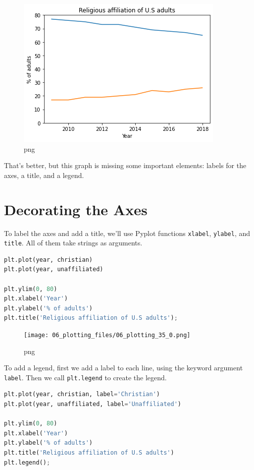 \documentclass[
]{book}
\newcommand{\passthrough}[1]{#1}
\begin{document}
\begin{figure}
\centering
\includegraphics{06_plotting_files/06_plotting_32_0.png}
\caption{png}
\end{figure}

That's better, but this graph is missing some important elements: labels
for the axes, a title, and a legend.

\section{Decorating the Axes}\label{decorating-the-axes}

To label the axes and add a title, we'll use Pyplot functions
\passthrough{\lstinline!xlabel!}, \passthrough{\lstinline!ylabel!}, and
\passthrough{\lstinline!title!}. All of them take strings as arguments.

\begin{lstlisting}[language=Python]
plt.plot(year, christian)
plt.plot(year, unaffiliated)

plt.ylim(0, 80)
plt.xlabel('Year')
plt.ylabel('% of adults')
plt.title('Religious affiliation of U.S adults');
\end{lstlisting}

\begin{figure}
\centering
\texttt{[image: 06\_plotting\_files/06\_plotting\_35\_0.png]}
\caption{png}
\end{figure}

To add a legend, first we add a label to each line, using the keyword
argument \passthrough{\lstinline!label!}. Then we call
\passthrough{\lstinline!plt.legend!} to create the legend.

\begin{lstlisting}[language=Python]
plt.plot(year, christian, label='Christian')
plt.plot(year, unaffiliated, label='Unaffiliated')

plt.ylim(0, 80)
plt.xlabel('Year')
plt.ylabel('% of adults')
plt.title('Religious affiliation of U.S adults')
plt.legend();
\end{lstlisting}
\end{document}
